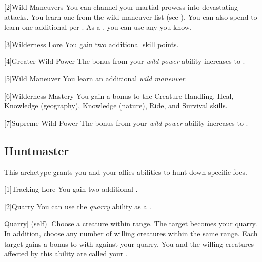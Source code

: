        [2]{Wild Maneuvers} 
        You can channel your martial prowess into devastating attacks.
        You learn one  from the wild maneuver list (see ).
        You can also spend  to learn one additional  per .
        As a , you can use any  you know.

        [3]{Wilderness Lore} You gain two additional skill points.

        [4]{Greater Wild Power} The bonus from your \textit{wild power} ability increases to .

        [5]{Wild Maneuver}
        You learn an additional \textit{wild maneuver}.

        [6]{Wilderness Mastery} You gain a  bonus to the Creature Handling, Heal, Knowledge (geography), Knowledge (nature), Ride, and Survival skills.

        [7]{Supreme Wild Power} The bonus from your \textit{wild power} ability increases to .

    \subsection{Huntmaster}
        This archetype grants you and your allies abilities to hunt down specific foes.

        [1]{Tracking Lore}
        You gain two additional .

        [2]{Quarry}\label{Quarry} You can use the \textit{quarry} ability as a .
        \begin{attuneability}{Quarry}[ (self)]
            Choose a creature within \rnglong range.
            The target becomes your quarry.
            In addition, choose any number of willing creatures within the same range.
            Each target gains a  bonus to  with  against your quarry.
            You and the willing creatures affected by this ability are called your .
        \end{attuneability}

